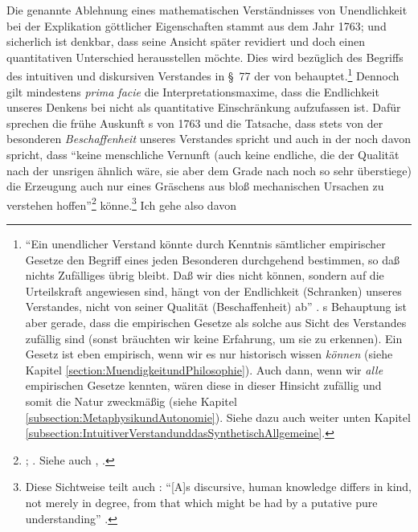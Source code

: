 Die genannte Ablehnung eines mathematischen Verständnisses von Unendlichkeit bei
der Explikation göttlicher Eigenschaften stammt aus dem Jahr 1763; und
sicherlich ist denkbar, dass  seine Ansicht später revidiert und doch
einen quantitativen Unterschied herausstellen möchte. Dies wird bezüglich des
Begriffs des intuitiven und diskursiven Verstandes in \S~77 der  von
behauptet.\footnote{\enquote{Ein unendlicher Verstand könnte durch Kenntnis
sämtlicher empirischer Gesetze den Begriff eines jeden Besonderen durchgehend
bestimmen, so daß nichts Zufälliges übrig bleibt. Daß wir dies nicht können,
sondern auf die Urteilskraft angewiesen sind, hängt von der Endlichkeit
(Schranken) unseres Verstandes, nicht von seiner Qualität (Beschaffenheit) ab}
\parencite[][148]{McLaughlin:KantsKritikderteleologischenUrteilskraft1989}.
s Behauptung ist aber gerade, dass die empirischen Gesetze
als solche aus Sicht des Verstandes zufällig sind (sonst bräuchten wir keine
Erfahrung, um sie zu erkennen). Ein Gesetz ist eben empirisch, wenn wir es nur
historisch wissen \emph{können} (siehe Kapitel
\ref{section:MuendigkeitundPhilosophie}). Auch dann, wenn wir \emph{alle}
empirischen Gesetze kennten, wären diese in dieser Hinsicht zufällig und somit
die Natur zweckmäßig (siehe Kapitel \ref{subsection:MetaphysikundAutonomie}).
Siehe dazu auch weiter unten Kapitel
\ref{subsection:IntuitiverVerstandunddasSynthetischAllgemeine}.} Dennoch gilt
mindestens \emph{prima facie} die Interpretationsmaxime, dass die Endlichkeit
unseres Denkens bei  nicht als quantitative Einschränkung
aufzufassen ist. Dafür sprechen die frühe Auskunft s von
1763 und die Tatsache, dass  stets von der besonderen
\emph{Beschaffenheit} unseres Verstandes spricht und auch in der  noch davon spricht, dass \enquote{keine menschliche Vernunft
(auch keine endliche, die der Qualität nach der unsrigen ähnlich wäre, sie aber
dem Grade nach noch so sehr überstiege) die Erzeugung auch nur eines Gräschens
aus bloß mechanischen Ursachen zu verstehen
hoffen}\footnote{\cite[][\S~77]{Kant:KritikderUrteilskraft2009}; \cite[][V:
409.33--37]{Kant:GesammelteWerke1900ff.}. Siehe auch
\cite[][\S~75]{Kant:KritikderUrteilskraft2009},
\cite[][V: 400.13--21]{Kant:GesammelteWerke1900ff.}.} könne.\footnote{Diese
Sichtweise teilt auch :
\enquote{[A]s discursive, human knowledge differs in kind, not merely in degree,
from that which might be had by a putative pure understanding}
\parencite[][17]{Allison:KantsTranscendentalIdealism2004}.} Ich gehe also davon
